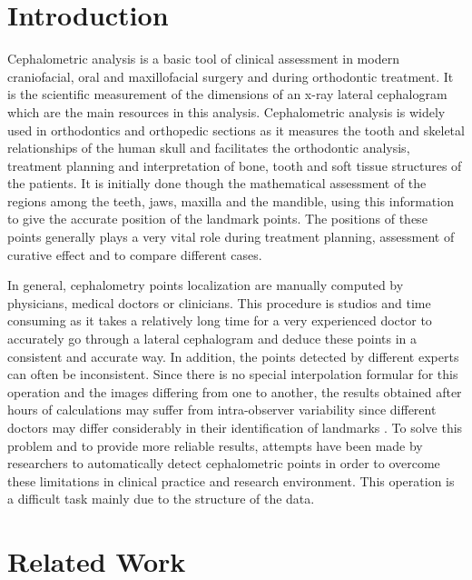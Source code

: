 \documentclass{elektr}
\begin{document}
\section{Introduction}
\label{Int} \tab Cephalometric analysis is a basic tool of clinical assessment in modern craniofacial, oral and maxillofacial surgery and during orthodontic treatment. It is the scientific measurement of the dimensions of an x-ray lateral cephalogram which are the main resources in this analysis\cite{ref1}. Cephalometric analysis is widely used in orthodontics and orthopedic sections as it measures the tooth and skeletal relationships of the human skull and facilitates the orthodontic analysis, treatment planning and interpretation of bone, tooth and soft tissue structures of the patients. It is initially done though the mathematical assessment of the regions among the teeth, jaws, maxilla and the mandible, using this information to give the accurate position of the landmark points. The positions of these points generally plays a very vital role during treatment planning, assessment of curative effect and to compare different cases.

In general, cephalometry points localization are manually computed by physicians, medical doctors or clinicians. This procedure is studios and time consuming as it takes a relatively long time for a very experienced doctor to accurately go through a lateral cephalogram and deduce these points in a consistent and accurate way. In addition, the points detected by different experts can often be inconsistent. Since there is no special interpolation formular for this operation and the images differing from one to another, the results obtained after hours of calculations may suffer from intra-observer variability since different doctors may differ considerably in their identification of landmarks \cite{ref2}. To solve this problem and to provide more reliable results, attempts have been made by researchers to automatically detect cephalometric points in order to overcome these limitations in clinical practice and research environment. This operation is a difficult task mainly due to the structure of the data. 

\section{Related Work}
\end{document}
